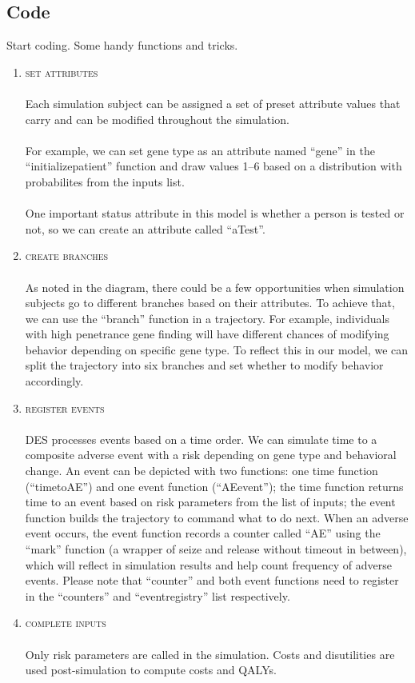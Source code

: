 \documentclass{article}
\begin{document}
\subsection{Code}
Start coding. Some handy functions and tricks. \\
\begin{enumerate}

\item
\textsc{set attributes} \\\\
Each simulation subject can be assigned a set of preset attribute values that carry and can be modified throughout the simulation.\\\\
For example, we can set gene type as an attribute named ``gene'' in the ``initialize\textunderscore patient'' function and draw values 1--6 based on a distribution with probabilites from the inputs list. \\\\
One important status attribute in this model is whether a person is tested or not, so we can create an attribute called ``aTest''.

\item
\textsc{create branches} \\\\
As noted in the diagram, there could be a few opportunities when simulation subjects go to different branches based on their attributes. To achieve that, we can use the ``branch'' function in a trajectory. For example, individuals with high penetrance gene finding will have different chances of modifying behavior depending on specific gene type. To reflect this in our model, we can split the trajectory into six branches and set whether to modify behavior accordingly.


\item
\textsc{register events} \\\\
DES processes events based on a time order. We can simulate time to a composite adverse event with a risk depending on gene type and behavioral change. An event can be depicted with two functions: one time function (``time\textunderscore to\textunderscore AE'') and one event function (``AE\textunderscore event''); the time function returns time to an event based on risk parameters from the list of inputs; the event function builds the trajectory to command what to do next. When an adverse event occurs, the event function records a counter called ``AE'' using the ``mark'' function (a wrapper of seize and release without timeout in between), which will reflect in simulation results and help count frequency of adverse events. Please note that ``counter'' and both event functions need to register in the ``counters'' and ``event\textunderscore registry'' list respectively.    

\item
\textsc{complete inputs} \\\\
Only risk parameters are called in the simulation. Costs and disutilities are used post-simulation to compute costs and QALYs.


\end{enumerate}
\pagebreak
\end{document}
